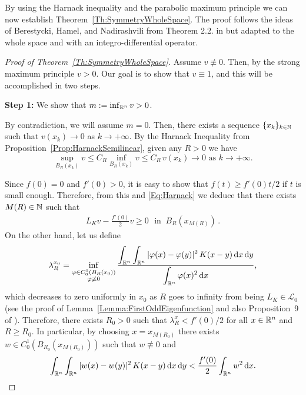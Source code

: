 By using the Harnack inequality and the parabolic maximum principle we can now establish Theorem~\ref{Th:SymmetryWholeSpace}. The proof follows the ideas of Berestycki, Hamel, and Nadirashvili from Theorem 2.2. in \cite{BerestyckiHamelNadi} but adapted to the whole space and with an integro-differential operator.

\begin{proof}[Proof of Theorem~\ref{Th:SymmetryWholeSpace}]


Assume $v\not\equiv 0$. Then, by the strong maximum principle $v>0$. Our goal is to show that $v
\equiv 1$, and this will be accomplished in two steps.

\textbf{Step 1:} We show that $m:=\inf_{\mathbb{R}^n} v >0$.

By contradiction, we will assume $m=0$. Then, there exists a sequence $\{x_k\}_{k\in\mathbb{N}}$ such that
$v(x_k)\rightarrow 0$ as $k \rightarrow +\infty$. By the Harnack Inequality from Proposition~\ref{Prop:HarnackSemilinear}, given any $R>0$ we have 
\begin{equation}
\label{Eq:Harnack}
\sup_{B_R(x_k)}v \leq C_R \inf_{B_R(x_k)}v \leq C_R \, v(x_k) \rightarrow 0 \,\,\text{as}\,\, k\rightarrow +\infty.
\end{equation}


Since $f(0) = 0 $ and $f'(0)>0$, it is easy to show that $f(t)\geq f'(0)t/2$ if $t$ is small
enough. Therefore, from this and \eqref{Eq:Harnack}  we deduce that there exists $M(R)\in\mathbb{N}$ such
that
\begin{align}
\label{Eq:WholeSpace2}
L_K  v - \frac{f'(0)}{2}v \geq 0 \,\,\textrm{ in }\ B_R(x_{M(R)})\,.
\end{align}
On the other hand, let us define
$$ \lambda_R^{x_0} = \inf_{\substack{\varphi\in C^1_0(B_R(x_0))\\ \varphi\not\equiv 0}} \frac{\displaystyle \int_{\mathbb{R}^n}\int_{\mathbb{R}^n}|\varphi(x)-\varphi(y)|^2\,K(x-y) \,\mathrm{d} x \,\mathrm{d} y}{\displaystyle \int_{\mathbb{R}^n}\varphi(x)^2 \,\mathrm{d} x}, $$
which decreases to zero uniformly in $x_0$ as $R$ goes to infinity from being $L_K \in\mathcal{L}_0$ (see the proof of Lemma~\ref{Lemma:FirstOddEigenfunction} and also Proposition~9 of \cite{ServadeiValdinoci}). Therefore, there exists $R_0>0$ such that $ \lambda_R^x < f'(0)/2$ for all $x\in \mathbb{R}^n$ and $R\geq R_0$. In particular, by choosing $x=x_{M(R_0)}$ there exists $w\in C^1_0(B_{R_0}(x_{M(R_0)}))$ such that $w\not\equiv 0$ and
\begin{equation}
\label{Eq:Eigenfunction}
\int_{\mathbb{R}^n}\int_{\mathbb{R}^n}|w(x)-w(y)|^2\,K(x-y) \,\mathrm{d} x \,\mathrm{d} y < \frac{f'(0)}{2}\int_{\mathbb{R}^n}w^2 \,\mathrm{d} x.
\end{equation}


\end{proof}
